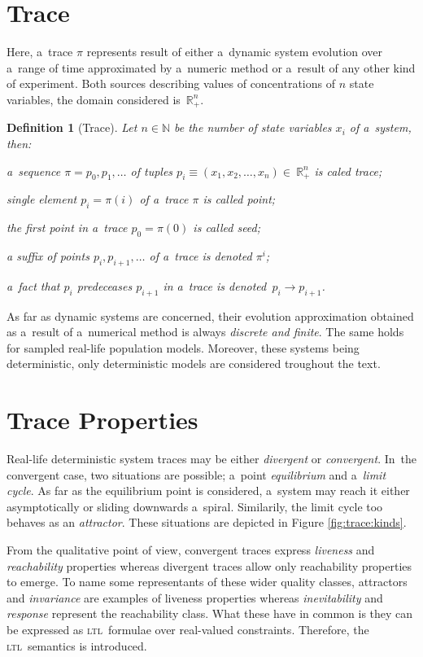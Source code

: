 \documentclass[12pt,twoside,draft]{fithesis}
\newcommand{\ltl}{\textsc{ltl}~}
\newcommand{\mReal}{\mathbb{R}}
\newcommand{\mNatural}{\mathbb{N}}
\newtheorem{mydef}{Definition}
\begin{document}
\section{Trace}
Here, a~trace $\pi$ represents result of either a~dynamic system
evolution over a~range of time\cite{sven,pospisil} approximated by
a~numeric method or a~result of any other kind of experiment.
Both sources describing values of concentrations of $n$ state variables,
the domain considered is~$\mReal_{+}^n$.

\begin{mydef}[Trace]
Let $n\in\mNatural$ be the number of state variables $x_i$ of a~system,
then:
\begin{inparaenum}
\item a~sequence $\pi=p_0,p_1,\dotsc$ of tuples
$p_i\equiv(x_1,x_2,\dotsc,x_n)\in~\mReal_{+}^n$ is caled trace;
\item single element $p_i=\pi(i)$ of a~trace $\pi$ is called point;
\item the first point in a~trace $p_0=\pi(0)$ is called seed;
\item a suffix of points $p_i,p_{i+1},\dotsc$ of a~trace is
denoted $\pi^i$;
\item a~fact that $p_i$ predeceases $p_{i+1}$ in a~trace is
denoted~$p_i\rightarrow p_{i+1}$.
\end{inparaenum}
\end{mydef}

As far as dynamic systems are concerned, their evolution approximation
obtained as a~result of a~numerical method is always \emph{discrete and
finite}. The same holds for sampled real-life population models.
Moreover, these systems being deterministic\cite{sven}, only
deterministic models are considered troughout the text.

\section{Trace Properties}
Real-life deterministic system traces may be either \emph{divergent} or
\emph{convergent}. In~the convergent case, two situations are possible;
a~point \emph{equilibrium} and a~\emph{limit cycle}. As far as the
equilibrium point is considered, a~system may reach it either
asymptotically or sliding downwards a~spiral. Similarily, the limit
cycle too behaves as an \emph{attractor}. These situations are depicted
in Figure \ref{fig:trace:kinds}.

From the qualitative point of view, convergent traces express
\emph{liveness} and \emph{reachability} properties whereas
divergent traces allow only reachability properties to emerge.
To name some representants of these wider quality classes,
attractors and  \emph{invariance} are examples of liveness
properties whereas \emph{inevitability} and \emph{response} represent
the reachability class\cite{rizk}. What these have in common is they
can be expressed as \ltl formulae over real-valued
constraints\cite{sven}. Therefore, the \ltl semantics is introduced.
\end{document}
